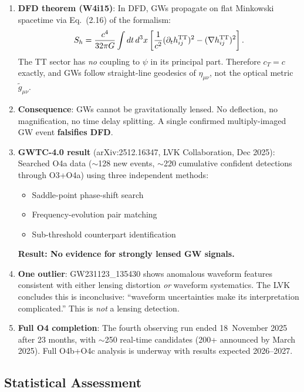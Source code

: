 \documentclass[11pt]{article}
\begin{document}
\begin{enumerate}
\item \textbf{DFD theorem (W4i15)}: In DFD, GWs propagate on flat Minkowski
  spacetime via Eq.~(2.16) of the formalism:
  \begin{equation}
  S_h = \frac{c^4}{32\pi G}\int dt\,d^3x \left[
    \frac{1}{c^2}(\partial_t h_{ij}^{\rm TT})^2
    - (\nabla h_{ij}^{\rm TT})^2
  \right].
  \end{equation}
  The TT sector has \emph{no} coupling to $\psi$ in its principal part.
  Therefore $c_T = c$ exactly, and GWs follow straight-line geodesics of
  $\eta_{\mu\nu}$, not the optical metric $\tilde{g}_{\mu\nu}$.

\item \textbf{Consequence}: GWs cannot be gravitationally lensed. No
  deflection, no magnification, no time delay splitting. A single confirmed
  multiply-imaged GW event \textbf{falsifies DFD}.

\item \textbf{GWTC-4.0 result} (arXiv:2512.16347, LVK Collaboration,
  Dec 2025): Searched O4a data ($\sim$128 new events, $\sim$220 cumulative
  confident detections through O3+O4a) using three independent methods:
  \begin{itemize}
  \item Saddle-point phase-shift search
  \item Frequency-evolution pair matching
  \item Sub-threshold counterpart identification
  \end{itemize}
  \textbf{Result: No evidence for strongly lensed GW signals.}

\item \textbf{One outlier}: GW231123\_135430 shows anomalous waveform features
  consistent with either lensing distortion \emph{or} waveform systematics.
  The LVK concludes this is inconclusive: ``waveform uncertainties make its
  interpretation complicated.'' This is \emph{not} a lensing detection.

\item \textbf{Full O4 completion}: The fourth observing run ended
  18~November 2025 after 23 months, with $\sim$250 real-time candidates
  (200+ announced by March 2025). Full O4b+O4c analysis is underway with
  results expected 2026--2027.
\end{enumerate}

\subsection{Statistical Assessment}
\end{document}
